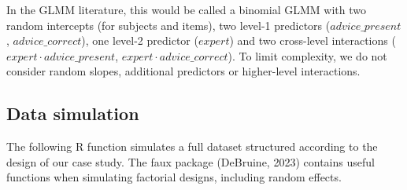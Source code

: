 \documentclass[
  man,floatsintext]{apa6}
\begin{document}
In the GLMM literature, this would be called a binomial GLMM with two random intercepts (for subjects and items), two level-1 predictors (\(advice\_present\), \(advice\_correct\)), one level-2 predictor (\(expert\)) and two cross-level interactions (\(expert \cdot advice\_present\), \(expert \cdot advice\_correct\)).
To limit complexity, we do not consider random slopes, additional predictors or higher-level interactions.

\hypertarget{data-simulation}{%
\subsection{Data simulation}\label{data-simulation}}

The following R function simulates a full dataset structured according to the design of our case study. The faux package (DeBruine, 2023) contains useful functions when simulating factorial designs, including random effects.
\end{document}

